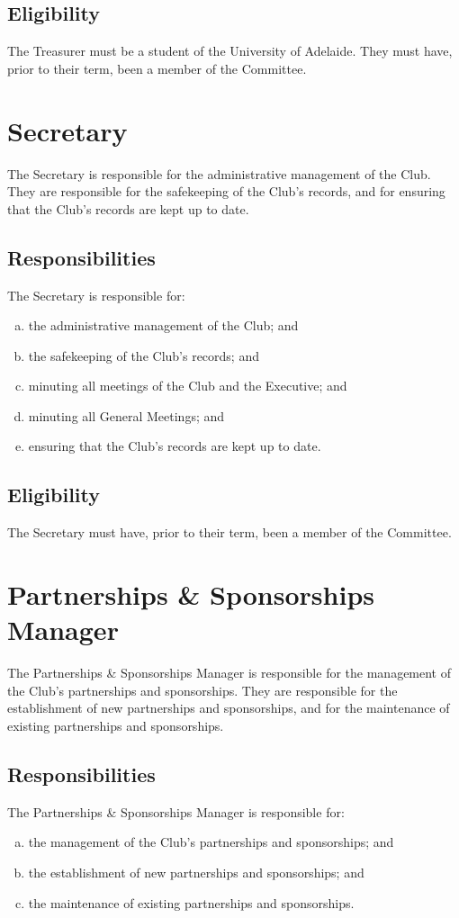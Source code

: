 \documentclass[11pt]{report}
\begin{document}
\subsection{Eligibility}
The Treasurer must be a student of the University of Adelaide. They must have, prior to their term, been a member of the Committee.

\section{Secretary}
The Secretary is responsible for the administrative management of the Club. They are responsible for the safekeeping of the Club's records, and for ensuring that the Club's records are kept up to date.
\subsection{Responsibilities}
The Secretary is responsible for:
\begin{enumerate}[(a)]
    \item the administrative management of the Club; and
    \item the safekeeping of the Club's records; and
    \item minuting all meetings of the Club and the Executive; and
    \item minuting all General Meetings; and
    \item ensuring that the Club's records are kept up to date.
\end{enumerate}
\subsection{Eligibility}
The Secretary must have, prior to their term, been a member of the Committee.

\section{Partnerships \& Sponsorships Manager}
The Partnerships \& Sponsorships Manager is responsible for the management of the Club's partnerships and sponsorships. They are responsible for the establishment of new partnerships and sponsorships, and for the maintenance of existing partnerships and sponsorships.
\subsection{Responsibilities}
The Partnerships \& Sponsorships Manager is responsible for:
\begin{enumerate}[(a)]
    \item the management of the Club's partnerships and sponsorships; and
    \item the establishment of new partnerships and sponsorships; and
    \item the maintenance of existing partnerships and sponsorships.
\end{enumerate}
\end{document}
